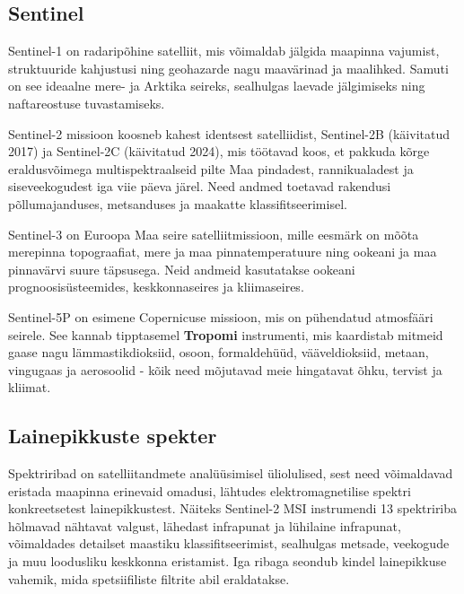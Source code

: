 \subsection{Sentinel}
Sentinel-1 on radaripõhine satelliit, mis võimaldab jälgida maapinna vajumist,
struktuuride kahjustusi ning geohazarde nagu maavärinad ja maalihked. Samuti on
see ideaalne mere- ja Arktika seireks, sealhulgas laevade jälgimiseks ning
naftareostuse tuvastamiseks. \cite{S1Applications}

Sentinel-2 missioon koosneb kahest identsest satelliidist, Sentinel-2B
(käivitatud 2017) ja Sentinel-2C (käivitatud 2024), mis töötavad koos, et
pakkuda kõrge eraldusvõimega multispektraalseid pilte Maa pindadest,
rannikualadest ja siseveekogudest iga viie päeva järel. Need andmed toetavad
rakendusi põllumajanduses, metsanduses ja maakatte klassifitseerimisel. \cite{S2Applications}

Sentinel-3 on Euroopa Maa seire satelliitmissioon, mille eesmärk on mõõta
merepinna topograafiat, mere ja maa pinnatemperatuure ning ookeani ja maa
pinnavärvi suure täpsusega. Neid andmeid kasutatakse ookeani prognoosisüsteemides,
keskkonnaseires ja kliimaseires. \cite{S3Mission}

Sentinel-5P on esimene Copernicuse missioon, mis on pühendatud atmosfääri
seirele. See kannab tipptasemel \textbf{Tropomi} instrumenti, mis kaardistab mitmeid
gaase nagu lämmastikdioksiid, osoon, formaldehüüd, vääveldioksiid, metaan,
vingugaas ja aerosoolid - kõik need mõjutavad meie hingatavat õhku, tervist ja
kliimat. \cite{S5PApplications}
\subsection{Lainepikkuste spekter}
Spektriribad on satelliitandmete analüüsimisel üliolulised, sest need
võimaldavad eristada maapinna erinevaid omadusi, lähtudes elektromagnetilise
spektri konkreetsetest lainepikkustest. Näiteks Sentinel-2 MSI instrumendi 13
spektririba hõlmavad nähtavat valgust, lähedast infrapunat ja lühilaine
infrapunat, võimaldades detailset maastiku klassifitseerimist, sealhulgas
metsade, veekogude ja muu loodusliku keskkonna eristamist. Iga ribaga seondub
kindel lainepikkuse vahemik, mida spetsiifiliste filtrite abil eraldatakse. \cite{S2Mission}

